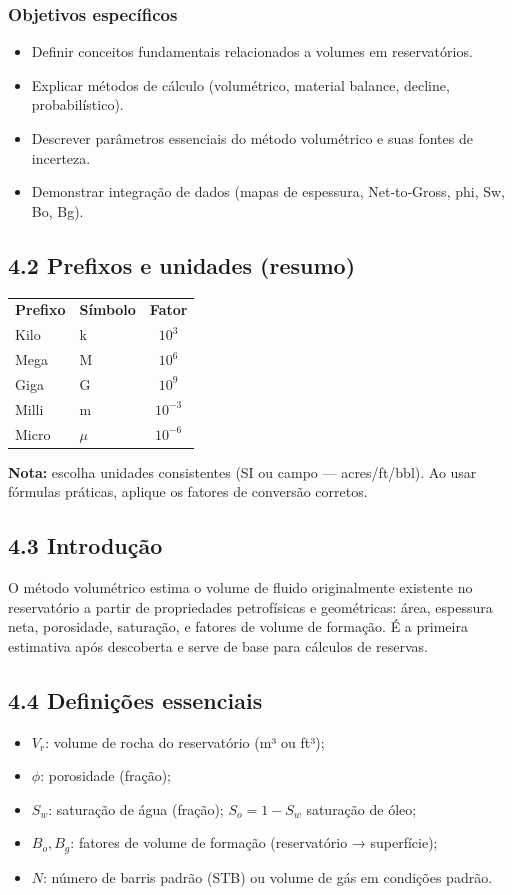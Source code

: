 \documentclass[11pt,a4paper]{article}
\begin{document}
\subsubsection{Objetivos específicos}
\begin{itemize}
\item Definir conceitos fundamentais relacionados a volumes em reservatórios.
\item Explicar métodos de cálculo (volumétrico, material balance, decline, probabilístico).
\item Descrever parâmetros essenciais do método volumétrico e suas fontes de incerteza.
\item Demonstrar integração de dados (mapas de espessura, Net‑to‑Gross, phi, Sw, Bo, Bg).
\end{itemize}

\subsection{4.2 Prefixos e unidades (resumo)}
\begin{tabular}{l l c}
\textbf{Prefixo} & \textbf{Símbolo} & \textbf{Fator} \\
Kilo & k & $10^{3}$ \\
Mega & M & $10^{6}$ \\
Giga & G & $10^{9}$ \\
Milli & m & $10^{-3}$ \\
Micro & $\mu$ & $10^{-6}$ \\
\end{tabular}

\medskip
\textbf{Nota:} escolha unidades consistentes (SI ou campo — acres/ft/bbl). Ao usar fórmulas práticas, aplique os fatores de conversão corretos.

\subsection{4.3 Introdução}
O método volumétrico estima o volume de fluido originalmente existente no reservatório a partir de propriedades petrofísicas e geométricas: área, espessura neta, porosidade, saturação, e fatores de volume de formação. É a primeira estimativa após descoberta e serve de base para cálculos de reservas.

\subsection{4.4 Definições essenciais}
\begin{itemize}
\item $V_r$: volume de rocha do reservatório (m³ ou ft³);
\item $\phi$: porosidade (fração);
\item $S_w$: saturação de água (fração); $S_o=1-S_w$ saturação de óleo;
\item $B_o, B_g$: fatores de volume de formação (reservatório → superfície);
\item $N$: número de barris padrão (STB) ou volume de gás em condições padrão.
\end{itemize}
\end{document}

